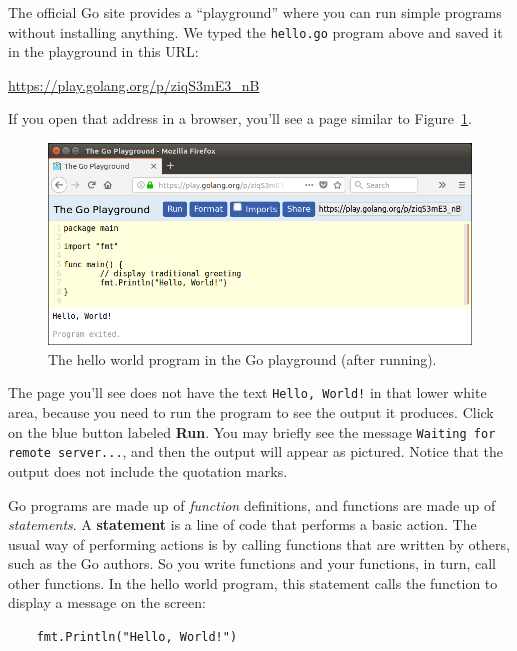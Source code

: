 The official Go site provides a ``playground'' where you can run simple programs without installing anything.
We typed the {\tt hello.go} program above and saved it in the playground in this URL:

\url{https://play.golang.org/p/ziqS3mE3_nB}

If you open that address in a browser, you'll see a page similar to Figure~\ref{fig.playhello}.

\begin{figure}[!ht]
\begin{center}
\includegraphics[width=1.0\textwidth]{figs/play-hello.png}
\caption{The hello world program in the Go playground (after running).}
\label{fig.playhello}
\end{center}
\end{figure}

The page you'll see does not have the text {\tt Hello, World!} in that lower white area,
because you need to run the program to see the output it produces.
Click on the blue button labeled {\bf Run}. You may briefly see the message {\tt Waiting for remote server...},
and then the output will appear as pictured. 
Notice that the output does not include the quotation marks.



Go programs are made up of {\em function} definitions, and functions are made up of {\em statements}.
A {\bf statement} is a line of code that performs a basic action.
The usual way of performing actions is by calling functions that are written by others, such as the Go authors.
So you write functions and your functions, in turn, call other functions.
In the hello world program, this statement calls the  function to display a message on the screen:

\begin{lstlisting}
	fmt.Println("Hello, World!")
\end{lstlisting}

